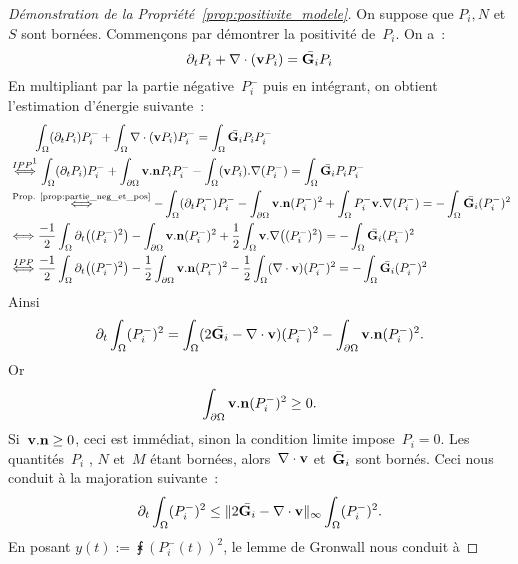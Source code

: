 \documentclass[main.tex]{subfiles}
\begin{document}
\begin{proof}[Démonstration de la Propriété~\ref{prop:positivite_modele}]
On suppose que $P_i,N$ et $S$ sont bornées. Commençons par démontrer la positivité de~$P_i$. On a~:
$$\partial_t P_i + \nabla\cdot (\mathbf{v} P_i) = \bar{{\bf G}_i}P_i $$
En multipliant par la partie négative~$P_i^-$ puis en intégrant, on obtient l'estimation d'énergie suivante~:
$$
\begin{aligned}
&\qquad \intx (\partial_t P_i) P_i^- + \intx \dive (\vit P_i) P_i^- = \intx \bar{\GG_i} P_i P_i^- \\
&\overset{IPP\protect\footnotemark}{\Longleftrightarrow} \intx (\partial_t P_i) P_i^- + \intbord \vit . \nn P_i P_i^- - \intx (\vit P_i).\nabla (P_i^-)  = \intx \bar{\GG_i} P_i P_i^-  \\
&\overset{\textrm{Prop. \ref{prop:partie_neg_et_pos}}}{\Longleftrightarrow}  - \intx (\partial_t P_i^-) P_i^- - \intbord \vit . \nn (P_i^-)^2 + \intx P_i^- \vit.\nabla (P_i^-)  = - \intx \bar{\GG_i} (P_i^-)^2  \\
&\Longleftrightarrow  \frac{-1}{2} \intx \partial_t \big( (P_i^-)^2 \big) - \intbord \vit . \nn (P_i^-)^2 + \frac{1}{2} \intx \vit.\nabla \big( (P_i^-)^2\big)   = - \intx \bar{\GG_i} (P_i^-)^2  \\
&\overset{IPP}{\Longleftrightarrow}  \frac{-1}{2} \intx \partial_t \big( (P_i^-)^2 \big) -\frac{1}{2} \intbord \vit . \nn (P_i^-)^2 - \frac{1}{2} \intx (\dive \vit)  (P_i^-)^2  = - \intx \bar{\GG_i} (P_i^-)^2  \\
\end{aligned}$$
Ainsi
\begin{equation}
\partial_t \int_\Omega (P_i^-)^2  = \int_\Omega (2\bar{{\bf G}_i} - \nabla\cdot \mathbf{v})  (P_i^-)^2 - \int_{\partial \Omega} \mathbf{v} . {\bf n} (P_i^-)^2.
\end{equation}
Or $$\int_{\partial \Omega} \mathbf{v} . {\bf n} (P_i^-)^2 \geq 0. $$
Si~$\mathbf{v}.{\bf n}\geq0$, ceci est immédiat, sinon la condition limite impose~$P_i=0$. 
Les quantités~$P_i$ , $N$ et~$M$ étant bornées, alors~$\nabla\cdot \mathbf{v}$ et~$\bar{{\bf G}}_i$ sont bornés. Ceci nous conduit à la majoration suivante~:
\begin{equation}\label{eq:demo_positivite}
\partial_t \int_\Omega (P_i^-)^2 \leq \| 2\bar{{\bf G}_i} - \nabla\cdot \mathbf{v} \|_{\infty} \int_\Omega (P_i^-)^2.
\end{equation}
En posant $y(t):=\displaystyle \intx (P_i^-(t))^2$, le lemme de Gronwall nous conduit à

\end{proof}
\end{document}
